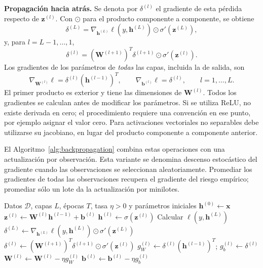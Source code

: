 \noindent\textbf{Propagación hacia atrás.}
Se denota por $\delta^{(l)}$ el gradiente de esta pérdida respecto de $\mathbf z^{(l)}$. Con $\odot$ para el producto componente a componente, se obtiene
\[
\delta^{(L)}=\nabla_{\mathbf h^{(L)}}\ell(y,\mathbf h^{(L)})
\odot\sigma'(\mathbf z^{(L)}),
\]
y, para $l=L-1,\ldots,1$,
\[
\delta^{(l)}=(\mathbf W^{(l+1)})^T\delta^{(l+1)}
\odot\sigma'(\mathbf z^{(l)}).
\]
Los gradientes de los parámetros de \emph{todas} las capas, incluida la de salida, son
\[
\nabla_{\mathbf W^{(l)}}\ell=\delta^{(l)}(\mathbf h^{(l-1)})^T,
\qquad
\nabla_{\mathbf b^{(l)}}\ell=\delta^{(l)},\qquad l=1,\ldots,L.
\]
El primer producto es exterior y tiene las dimensiones de $\mathbf W^{(l)}$. Todos los gradientes se calculan antes de modificar los parámetros. Si se utiliza ReLU, no existe derivada en cero; el procedimiento requiere una convención en ese punto, por ejemplo asignar el valor cero. Para activaciones vectoriales no separables debe utilizarse su jacobiano, en lugar del producto componente a componente anterior.

El Algoritmo~\ref{alg:backpropagation} combina estas operaciones con una actualización por observación. Esta variante se denomina descenso estocástico del gradiente cuando las observaciones se seleccionan aleatoriamente. Promediar los gradientes de todas las observaciones recupera el gradiente del riesgo empírico; promediar sólo un lote da la actualización por minilotes.

\begin{algorithm}[H]
\caption{Retropropagación y actualización por observación}
\label{alg:backpropagation}
\begin{algorithmic}[1]
\Require Datos $\mathcal D$, capas $L$, épocas $T$, tasa $\eta>0$ y parámetros iniciales
        \State $\mathbf h^{(0)}\gets\mathbf x$
            \State $\mathbf z^{(l)}\gets\mathbf W^{(l)}\mathbf h^{(l-1)}+\mathbf b^{(l)}$
            \State $\mathbf h^{(l)}\gets\sigma(\mathbf z^{(l)})$
        \EndFor
        \State Calcular $\ell(y,\mathbf h^{(L)})$
        \State $\delta^{(L)}\gets\nabla_{\mathbf h^{(L)}}\ell(y,\mathbf h^{(L)})\odot\sigma'(\mathbf z^{(L)})$
            \State $\delta^{(l)}\gets(\mathbf W^{(l+1)})^T\delta^{(l+1)}\odot\sigma'(\mathbf z^{(l)})$
        \EndFor
            \State $g_W^{(l)}\gets\delta^{(l)}(\mathbf h^{(l-1)})^T$; $g_b^{(l)}\gets\delta^{(l)}$
        \EndFor
            \State $\mathbf W^{(l)}\gets\mathbf W^{(l)}-\eta g_W^{(l)}$
            \State $\mathbf b^{(l)}\gets\mathbf b^{(l)}-\eta g_b^{(l)}$
        \EndFor
    \EndFor
\EndFor
\end{algorithmic}
\end{algorithm}

